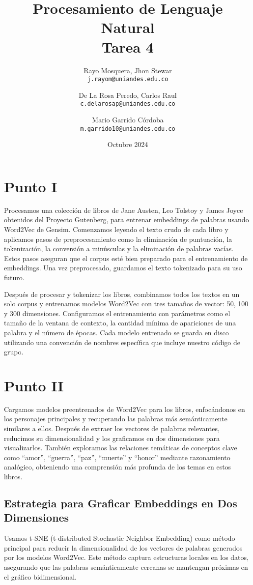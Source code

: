 \documentclass[11pt,english]{article}
\title{Procesamiento de Lenguaje Natural\\
Tarea 4
}
\author{
  Rayo Mosquera, Jhon Stewar\\
  \texttt{j.rayom@uniandes.edu.co}
  \and
  De La Rosa Peredo, Carlos Raul\\
  \texttt{c.delarosap@uniandes.edu.co}\and
  Mario Garrido Córdoba\\
   \texttt{m.garrido10@uniandes.edu.co}
  \\ 
}
\date{Octubre 2024}
\theoremstyle{plain}
\begin{document}
\maketitle

\section*{Punto I}

Procesamos una colección de libros de Jane Austen, Leo Tolstoy y James Joyce obtenidos del Proyecto Gutenberg, para entrenar embeddings de palabras usando Word2Vec de Gensim. Comenzamos leyendo el texto crudo de cada libro y aplicamos pasos de preprocesamiento como la eliminación de puntuación, la tokenización, la conversión a minúsculas y la eliminación de palabras vacías. Estos pasos aseguran que el corpus esté bien preparado para el entrenamiento de embeddings. Una vez preprocesado, guardamos el texto tokenizado para su uso futuro.

Después de procesar y tokenizar los libros, combinamos todos los textos en un solo corpus y entrenamos modelos Word2Vec con tres tamaños de vector: 50, 100 y 300 dimensiones. Configuramos el entrenamiento con parámetros como el tamaño de la ventana de contexto, la cantidad mínima de apariciones de una palabra y el número de épocas. Cada modelo entrenado se guarda en disco utilizando una convención de nombres específica que incluye nuestro código de grupo.

\section*{Punto II}

Cargamos modelos preentrenados de Word2Vec para los libros, enfocándonos en los personajes principales y recuperando las palabras más semánticamente similares a ellos. Después de extraer los vectores de palabras relevantes, reducimos su dimensionalidad y los graficamos en dos dimensiones para visualizarlos. También exploramos las relaciones temáticas de conceptos clave como ``amor'', ``guerra'', ``paz'', ``muerte'' y ``honor'' mediante razonamiento analógico, obteniendo una comprensión más profunda de los temas en estos libros.

\subsection*{Estrategia para Graficar Embeddings en Dos Dimensiones}

Usamos t-SNE (t-distributed Stochastic Neighbor Embedding) como método principal para reducir la dimensionalidad de los vectores de palabras generados por los modelos Word2Vec. Este método captura estructuras locales en los datos, asegurando que las palabras semánticamente cercanas se mantengan próximas en el gráfico bidimensional.
\end{document}

